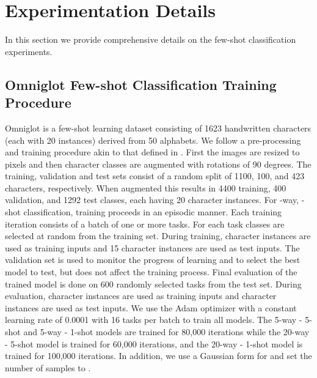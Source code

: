 \documentclass{article}
\begin{document}
\section{Experimentation Details}
\label{app:experimention_details_classification}
\setcounter{figure}{0}   
\setcounter{table}{0}
\setcounter{equation}{0}

In this section we provide comprehensive details on the few-shot classification experiments.

\label{app:complete_few_shot_classification_results}





\subsection{Omniglot Few-shot Classification Training Procedure}
\label{app:experimention_details_omniglot}

Omniglot \citep{lake2011one} is a few-shot learning dataset consisting of 1623 handwritten characters (each with 20 instances) derived from 50 alphabets. We follow a pre-processing and training procedure akin to that defined in \citep{vinyals2016matching}. First the images are resized to  pixels and then character classes are augmented with rotations of 90 degrees. The training, validation and test sets consist of a random split of 1100, 100, and 423 characters, respectively. When augmented this results in 4400 training, 400 validation, and 1292 test classes, each having 20 character instances. For -way, -shot classification, training proceeds in an episodic manner. Each training iteration consists of a batch of one or more tasks. For each task  classes are selected at random from the training set. During training,  character instances are used as training inputs and 15 character instances are used as test inputs. The validation set is used to monitor the progress of learning and to select the best model to test, but does not affect the training process. Final evaluation of the trained model is done on 600 randomly selected tasks from the test set. During evaluation,  character instances are used as training inputs and  character instances are used as test inputs. We use the Adam \citep{kingma2014adam} optimizer with a constant learning rate of 0.0001 with 16 tasks per batch to train all models. The 5-way - 5-shot and 5-way - 1-shot models are trained for 80,000 iterations while the 20-way - 5-shot model is trained for 60,000 iterations, and the 20-way - 1-shot model is trained for 100,000 iterations. In addition, we use a Gaussian form for  and set the number of  samples to . 
\end{document}
